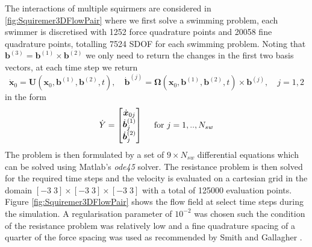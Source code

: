 The interactions of multiple squirmers are considered in \cref{fig:Squiremer3DFlowPair} where we first solve a swimming problem, each swimmer is discretised with 1252 force quadrature points and 20058 fine quadrature points, totalling 7524 SDOF for each swimming problem. Noting that $\bm{b}^{(3)} = \bm{b}^{(1)} \times \bm{b}^{(2)}$ we only need to return the changes in the first two basis vectors, at each time step we return 
\begin{equation*}
    {\dot{\bm{x}}}_{0}=\bm{U}\left(\bm{x}_{0}, \bm{b}^{(1)}, \bm{b}^{(2)}, t\right), \quad \dot{\bm{b}}^{(j)}=\bm{\Omega}\left(\bm{x}_{0}, \bm{b}^{(1)}, \bm{b}^{(2)}, t\right) \times \bm{b}^{(j)}, \quad j=1,2
\end{equation*}
in the form
\begin{equation*}
\arraycolsep=0.4pt\def\arraystretch{1}
\dot{Y} = \begin{bmatrix}
    {\dot{\bm{x}}_{0 j}} \\
    {\dot{\bm{b}}^{(1)}}_j \\
    {\dot{\bm{b}}^{(2)}}_j
\end{bmatrix} \quad \text{ for } j=1,..,N_{sw}
\end{equation*}
The problem is then formulated by a set of $9 \times N_{sw}$ differential equations which can be solved using Matlab's \textit{ode45} solver. The resistance problem is then solved for the required time steps and the velocity is evaluated on a cartesian grid in the domain $[-3\; 3] \times [-3\; 3] \times [-3\; 3]$ with a total of 125000 evaluation points. Figure \ref{fig:Squiremer3DFlowPair} shows the flow field at select time steps during the simulation. A regularisation parameter of $10^{-2}$ was chosen such the condition of the resistance problem was relatively low and a fine quadrature spacing of a quarter of the force spacing was used as recommended by Smith and Gallagher \cite{Gallagher2020}.  

